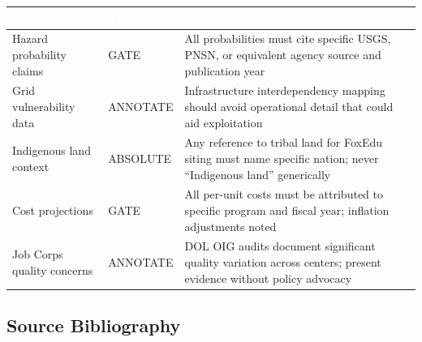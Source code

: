 \documentclass[11pt,letterpaper]{article}
\newcommand{\tableheader}[1]{\textbf{\sffamily\textcolor{white}{#1}}}
\begin{document}
\begin{center}
\begin{tabularx}{\textwidth}{L{3.5cm}L{2cm}X}
\toprule
{}
\tableheader{Area} & \tableheader{Type} & \tableheader{Handling Requirement} \\
\midrule
Hazard probability claims & GATE & All probabilities must cite specific USGS, PNSN, or equivalent agency source and publication year \\
Grid vulnerability data & ANNOTATE & Infrastructure interdependency mapping should avoid operational detail that could aid exploitation \\
Indigenous land context & ABSOLUTE & Any reference to tribal land for FoxEdu siting must name specific nation; never ``Indigenous land'' generically \\
Cost projections & GATE & All per-unit costs must be attributed to specific program and fiscal year; inflation adjustments noted \\
Job Corps quality concerns & ANNOTATE & DOL OIG audits document significant quality variation across centers; present evidence without policy advocacy \\
\bottomrule
\end{tabularx}
\end{center}

\subsection{Source Bibliography}
\end{document}
